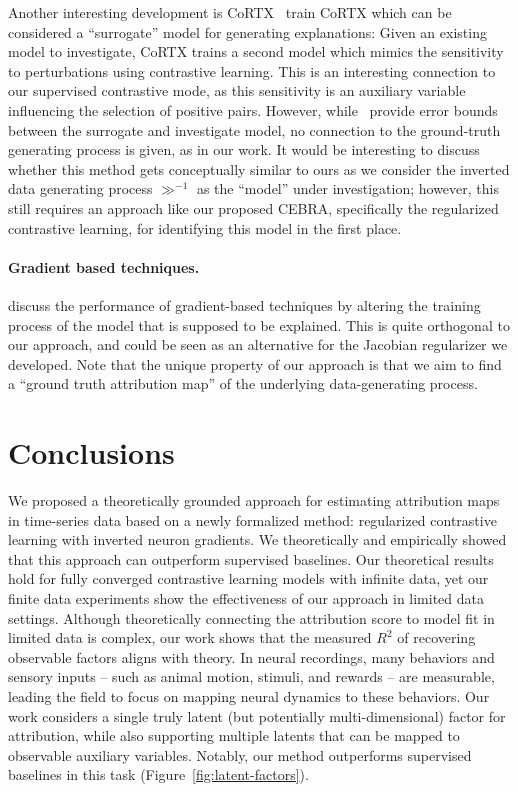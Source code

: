     Another interesting development is CoRTX~\cite{chuang2023cortx} train CoRTX which can be considered a ``surrogate'' model for generating explanations: Given an existing model to investigate, CoRTX trains a second model which mimics the sensitivity to perturbations using contrastive learning. This is an interesting connection to our supervised contrastive mode, as this sensitivity is an auxiliary variable influencing the selection of positive pairs. However, while~\citealp{chuang2023cortx} provide error bounds between the surrogate and investigate model, no connection to the ground-truth generating process is given, as in our work. It would be interesting to discuss whether this method gets conceptually similar to ours as we consider the inverted data generating process $\gg^{-1}$ as the ``model'' under investigation; however, this still requires an approach like our proposed CEBRA, specifically the regularized contrastive learning, for identifying this model in the first place.

\paragraph{Gradient based techniques.} 

    \citealp{ismail2021improvingdeeplearninginterpretability} discuss the performance of gradient-based techniques by altering the training process of the model that is supposed to be explained. This is quite orthogonal to our approach, and could be seen as an alternative for the Jacobian regularizer we developed. Note that the unique property of our approach is that we aim to find a ``ground truth attribution map'' of the underlying data-generating process.
    

\balance
\section{Conclusions}
\label{sec:discussion}


    We proposed a theoretically grounded approach for estimating attribution maps in time-series data based on a newly formalized method: regularized contrastive learning with inverted neuron gradients. 
    We theoretically and empirically showed that this approach can outperform supervised baselines.
    Our theoretical results hold for fully converged contrastive learning models with infinite data, yet our finite data experiments show the effectiveness of our approach in limited data settings. 
    Although theoretically connecting the attribution score to model fit in limited data is complex, our work shows that the measured $R^2$ of recovering observable factors aligns with theory.
    In neural recordings, many behaviors and sensory inputs -- such as animal motion, stimuli, and rewards -- are measurable, leading the field to focus on mapping neural dynamics to these behaviors. Our work considers a single truly latent (but potentially multi-dimensional) factor for attribution, while also supporting multiple latents that can be mapped to observable auxiliary variables. Notably, our method outperforms supervised baselines in this task (Figure~\ref{fig:latent-factors}). 
    
